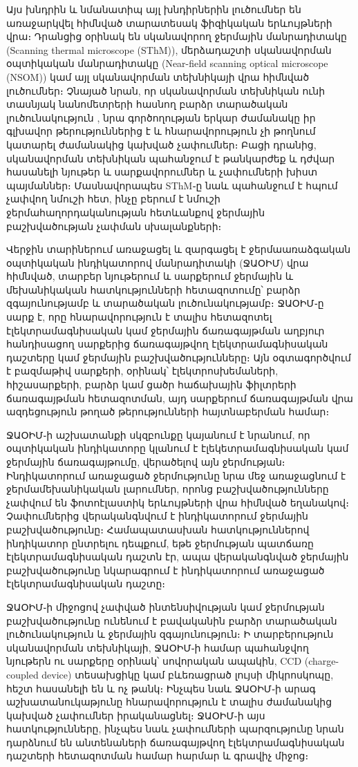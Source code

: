 \documentclass[12pt, fleqn]{report}
\begin{document}
Այս խնդրին և նմանատիպ այլ խնդիրներին լուծումներ են առաջարկվել հիմնված տարատեսակ ֆիզիկական երևույթների վրա։ Դրանցից օրինակ են սկանավորող ջերմային մանրադիտակը (Scanning thermal microscope (SThM)), մերձադաշտի սկանավորման օպտիկական մանրադիտակը (Near-field scanning optical microscope (NSOM)) կամ այլ սկանավորման տեխնիկայի վրա հիմնված լուծումներ։ Չնայած նրան, որ սկանավորման տեխնիկան ունի տասնյակ նանոմետրերի հասնող բարձր տարածական լուծունակություն \cite{yue2012nanoscalethermal}, նրա գործողության երկար ժամանակը իր գլխավոր թերություններից է և հնարավորություն չի թողնում կատարել ժամանակից կախված չափումներ։ Բացի դրանից, սկանավորման տեխնիկան պահանջում է թանկարժեք և դժվար հասանելի նյութեր և սարքավորումներ և չափումների խիստ պայմաններ։ Մասնավորապես SThM֊ը նաև պահանջում է հպում չափվող նմուշի հետ, ինչը բերում է նմուշի ջերմահաղորդականության հետևանքով ջերմային բաշխվածության չափման սխալանքների։

Վերջին տարիներում առաջացել և զարգացել է ջերմաառաձգական օպտիկական ինդիկատորով մանրադիտակի (ՋԱՕԻՄ) վրա հիմնված, տարբեր նյութերում և սարքերում ջերմային և մեխանիկական հատկությունների հետազոտումը՝  բարձր զգայունությամբ և տարածական լուծունակությամբ։ ՋԱՕԻՄ֊ը սարք է, որը հնարավորություն է տալիս հետազոտել էլեկտրամագնիսական կամ ջերմային ճառագայթման աղբյուր հանդիսացող սարքերից ճառագայթվող էլեկտրամագնիսական դաշտերը կամ ջերմային բաշխվածությունները։ Այն օգտագործվում է բազմաթիվ սարքերի, օրինակ՝ էլեկտրոսխեմաների, հիշասարքերի, բարձր կամ ցածր հաճախային ֆիլտրերի ճառագայթման հետազոտման, այդ սարքերում  ճառագայթման վրա ազդեցություն թողած թերությունների հայտնաբերման համար։

ՋԱՕԻՄ֊ի աշխատանքի սկզբունքը կայանում է նրանում, որ օպտիկական ինդիկատորը կլանում է էլեկետրամագնիսական կամ ջերմային ճառագայթումը, վերածելով այն ջերմության։ Ինդիկատորում առաջացած ջերմությունը նրա մեջ առաջացնում է ջերմամեխանիկական լարումներ, որոնց բաշխվածությունները չափվում են ֆոտոէլաստիկ երևույթների վրա հիմնված եղանակով։ Չափումներից վերականգնվում է ինդիկատորում ջերմային բաշխվածությունը։ Համապատասխան հատկություններով ինդիկատոր ընտրելու դեպքում, եթե ջերմության պատճառը էլեկտրամագնիսական դաշտն էր, ապա վերականգնված ջերմային բաշխվածությունը նկարագրում է ինդիկատորում առաջացած էլեկտրամագնիսական դաշտը։

ՋԱՕԻՄ֊ի միջոցով չափված ինտենսիվության կամ ջերմության բաշխվածությունը ունենում է բավականին բարձր տարածական լուծունակություն և ջերմային զգայունություն։ Ի տարբերություն սկանավորման տեխնիկայի, ՋԱՕԻՄ֊ի համար պահանջվող նյութերն ու սարքերը օրինակ՝ սովորական ապակին, CCD (charge-coupled device) տեսախցիկը կամ բևեռացրած լույսի միկրոսկոպը, հեշտ հասանելի են և ոչ թանկ։ Ինչպես նաև ՋԱՕԻՄ֊ի արագ աշխատանուկաթյունը հնարավորություն է տալիս ժամանակից կախված չափումներ իրականացնել։ ՋԱՕԻՄ֊ի այս հատկությունները, ինչպես նաև չափումների պարզությունը նրան դարձնում են անտենաների ճառագայթվող էլեկտրամագնիսական դաշտերի հետազոտման համար հարմար և գրավիչ միջոց։
\end{document}

